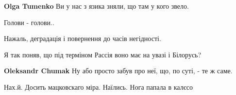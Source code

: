 \begin{itemize}
\begin{itemize}
 
\textbf{Olga Tumenko} Ви у нас з язика зняли, що там у кого звело.

 
Голови - голови..
\end{itemize}

 
Нажаль, деградація і повернення до часів негідності.

 
Я так поняв, що під терміном Рассія воно має на увазі і Білорусь?

\begin{itemize}
 
\textbf{Oleksandr Chumak} Ну або просто забув про неї, що, по суті, - те ж саме.
\end{itemize}

 
Нах.й. Досить мацковскаго міра. Наїлись. Нога папала в калєсо


\end{itemize}
